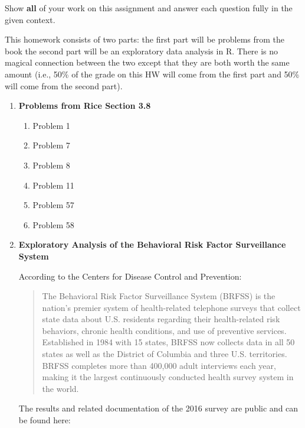 \documentclass[11pt]{article}\usepackage[]{graphicx}\usepackage[]{color}
\begin{document}
\pagestyle{fancy} 

Show \textbf{all} of your work on this assignment and answer each question fully in the given context.

This homework consists of two parts: the first part will be problems from the book the second part will be an exploratory data analysis in R. There is no magical connection between the two except that they are both worth the same amount (i.e., 50\% of the grade on this HW will come from the first part and 50\% will come from the second part).

\begin{enumerate}

\item \textbf{Problems from Rice Section 3.8}

\begin{enumerate}


\item Problem 1

\item Problem 7

\item Problem 8

\item Problem 11

\item Problem 57

\item Problem 58

\end{enumerate}

\item \textbf{Exploratory Analysis of the Behavioral Risk Factor Surveillance System}
      
According to the Centers for Disease Control and Prevention:

\begin{quote}
The Behavioral Risk Factor Surveillance System (BRFSS) is the nation's premier system of health-related telephone surveys that collect state data about U.S. residents regarding their health-related risk behaviors, chronic health conditions, and use of preventive services. Established in 1984 with 15 states, BRFSS now collects data in all 50 states as well as the District of Columbia and three U.S. territories. BRFSS completes more than 400,000 adult interviews each year, making it the largest continuously conducted health survey system in the world.
\end{quote}

The results and related documentation of the 2016 survey are public and can be found here:


\end{enumerate}
\end{document}

